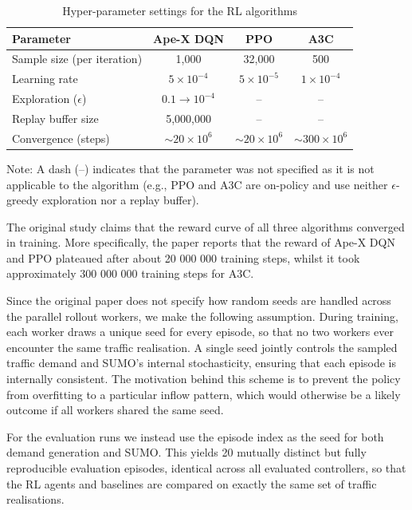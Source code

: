 \begin{table}[H]
    \centering
    \caption{Hyper-parameter settings for the RL algorithms}
    \label{tab:rl_parameters}
    \begin{tabular}{@{}lccc@{}}
    \toprule
    \textbf{Parameter} & \textbf{Ape-X DQN} & \textbf{PPO} & \textbf{A3C} \\ \midrule
    Sample size (per iteration) & 1,000 & 32,000 & 500 \\
    Learning rate & $5 \times 10^{-4}$ & $5 \times 10^{-5}$ & $1 \times 10^{-4}$ \\
    Exploration ($\epsilon$) & $0.1 \to 10^{-4}$ & -- & -- \\
    Replay buffer size & 5,000,000 & -- & -- \\
    Convergence (steps) & $\sim 20 \times 10^6$ & $\sim 20 \times 10^6$ & $\sim 300 \times 10^6$ \\ \bottomrule
    \end{tabular}

    \vspace{0.5em}
    \begin{minipage}{0.95\linewidth}
    \small Note: A dash (--) indicates that the parameter was not specified as it is not applicable to the algorithm (e.g., PPO and A3C are on-policy and use neither $\epsilon$-greedy exploration nor a replay buffer).
    \end{minipage}
\end{table}


The original study claims that the reward curve of all three algorithms converged in training. More specifically, the paper reports that the reward of Ape-X DQN and PPO plateaued after about 20 000 000 training steps, whilst it took approximately 300 000 000 training steps for A3C.

Since the original paper does not specify how random seeds are handled across the parallel rollout workers, we make the following assumption. During training, each worker draws a unique seed for every episode, so that no two workers ever encounter the same traffic realisation. A single seed jointly controls the sampled traffic demand and SUMO's internal stochasticity, ensuring that each episode is internally consistent. The motivation behind this scheme is to prevent the policy from overfitting to a particular inflow pattern, which would otherwise be a likely outcome if all workers shared the same seed.

For the evaluation runs we instead use the episode index as the seed for both demand generation and SUMO. This yields 20 mutually distinct but fully reproducible evaluation episodes, identical across all evaluated controllers, so that the RL agents and baselines are compared on exactly the same set of traffic realisations.
